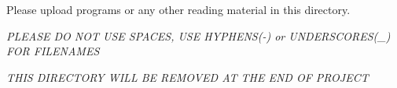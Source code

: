 Please upload programs or any other reading material in this directory.

{\itshape P\+L\+E\+A\+SE DO N\+OT U\+SE S\+P\+A\+C\+ES, U\+SE H\+Y\+P\+H\+E\+NS(-\/) or U\+N\+D\+E\+R\+S\+C\+O\+R\+E\+S(\+\_\+) F\+OR F\+I\+L\+E\+N\+A\+M\+ES}

{\itshape T\+H\+IS D\+I\+R\+E\+C\+T\+O\+RY W\+I\+LL BE R\+E\+M\+O\+V\+ED AT T\+HE E\+ND OF P\+R\+O\+J\+E\+CT} 
